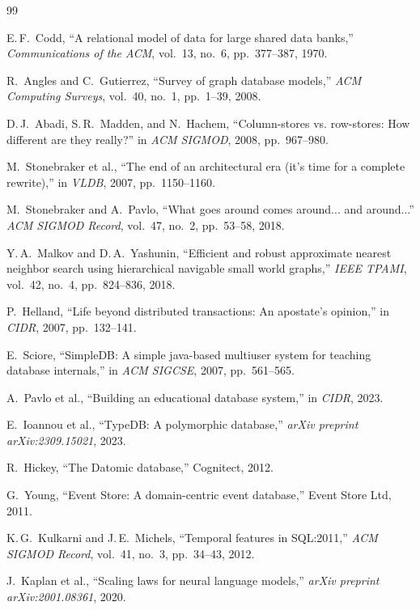 \documentclass[11pt,a4paper]{article}
\begin{document}
\begin{thebibliography}{99}

 E.\,F.~Codd, ``A relational model of data for large shared data
  banks,'' \emph{Communications of the ACM}, vol.~13, no.~6, pp.~377--387, 1970.

 R.~Angles and C.~Gutierrez, ``Survey of graph database
  models,'' \emph{ACM Computing Surveys}, vol.~40, no.~1, pp.~1--39, 2008.

 D.\,J.~Abadi, S.\,R.~Madden, and N.~Hachem, ``Column-stores vs.
  row-stores: How different are they really?'' in \emph{ACM SIGMOD}, 2008,
  pp.~967--980.

 M.~Stonebraker et al., ``The end of an architectural era
  (it's time for a complete rewrite),'' in \emph{VLDB}, 2007, pp.~1150--1160.

 M.~Stonebraker and A.~Pavlo, ``What goes around comes
  around... and around...'' \emph{ACM SIGMOD Record}, vol.~47, no.~2, pp.~53--58, 2018.

 Y.\,A.~Malkov and D.\,A.~Yashunin, ``Efficient and robust
  approximate nearest neighbor search using hierarchical navigable small world
  graphs,'' \emph{IEEE TPAMI}, vol.~42, no.~4, pp.~824--836, 2018.

 P.~Helland, ``Life beyond distributed transactions: An
  apostate's opinion,'' in \emph{CIDR}, 2007, pp.~132--141.

 E.~Sciore, ``SimpleDB: A simple java-based multiuser system
  for teaching database internals,'' in \emph{ACM SIGCSE}, 2007, pp.~561--565.

 A.~Pavlo et al., ``Building an educational database system,''
  in \emph{CIDR}, 2023.

 E.~Ioannou et al., ``TypeDB: A polymorphic database,''
  \emph{arXiv preprint arXiv:2309.15021}, 2023.

 R.~Hickey, ``The Datomic database,'' Cognitect, 2012.

 G.~Young, ``Event Store: A domain-centric event database,''
  Event Store Ltd, 2011.

 K.\,G.~Kulkarni and J.\,E.~Michels, ``Temporal features in
  SQL:2011,'' \emph{ACM SIGMOD Record}, vol.~41, no.~3, pp.~34--43, 2012.

 J.~Kaplan et al., ``Scaling laws for neural language models,''
  \emph{arXiv preprint arXiv:2001.08361}, 2020.

\end{thebibliography}
\end{document}

